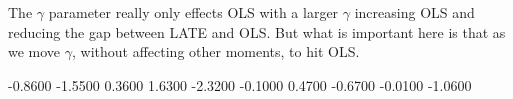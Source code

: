 \documentclass[pdftex,11pt]{article}
\begin{document}
The $\gamma$ parameter really only effects OLS with a larger $\gamma$ increasing OLS and reducing the gap between LATE and OLS. But what is important here is that as we move $\gamma$, without affecting other moments, to hit OLS.







   -0.8600
   -1.5500
    0.3600
    1.6300
   -2.3200
   -0.1000
    0.4700
   -0.6700
   -0.0100
   -1.0600
\end{document}

